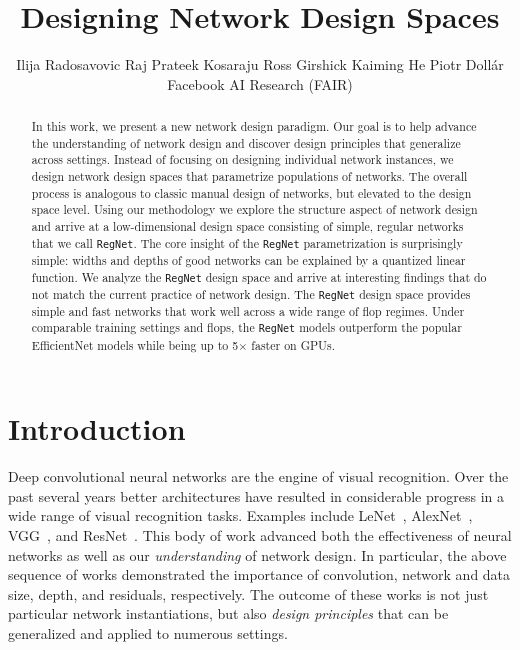 \documentclass[10pt,twocolumn,letterpaper]{article}
\newcommand{\dsname}[1]{\texttt{\small #1}\xspace}
\newcommand{\regnet}{\dsname{RegNet}}
\begin{document}
\title{Designing Network Design Spaces}
\author{%
 Ilija Radosavovic \quad Raj Prateek Kosaraju \quad Ross Girshick \quad Kaiming He \quad Piotr Doll\'ar\\[2mm]
 Facebook AI Research (FAIR)}
\maketitle

\begin{abstract}
In this work, we present a new network design paradigm. Our goal is to help advance the understanding of network design and discover design principles that generalize across settings. Instead of focusing on designing individual network instances, we design network design spaces that parametrize populations of networks. The overall process is analogous to classic manual design of networks, but elevated to the design space level. Using our methodology we explore the structure aspect of network design and arrive at a low-dimensional design space consisting of simple, regular networks that we call \regnet. The core insight of the \regnet parametrization is surprisingly simple: widths and depths of good networks can be explained by a quantized linear function. We analyze the \regnet design space and arrive at interesting findings that do not match the current practice of network design. The \regnet design space provides simple and fast networks that work well across a wide range of flop regimes. Under comparable training settings and flops, the \regnet models outperform the popular EfficientNet models while being up to 5$\times$ faster on GPUs.
\end{abstract}\vspace{-3mm}

\section{Introduction}

Deep convolutional neural networks are the engine of visual recognition. Over the past several years better architectures have resulted in considerable progress in a wide range of visual recognition tasks. Examples include LeNet~\cite{LeCun1989}, AlexNet~\cite{Krizhevsky2012}, VGG~\cite{Simonyan2015}, and ResNet~\cite{He2016}. This body of work advanced both the effectiveness of neural networks as well as our \emph{understanding} of network design. In particular, the above sequence of works demonstrated the importance of convolution, network and data size, depth, and residuals, respectively. The outcome of these works is not just particular network instantiations, but also \emph{design principles} that can be generalized and applied to numerous settings.
\end{document}
